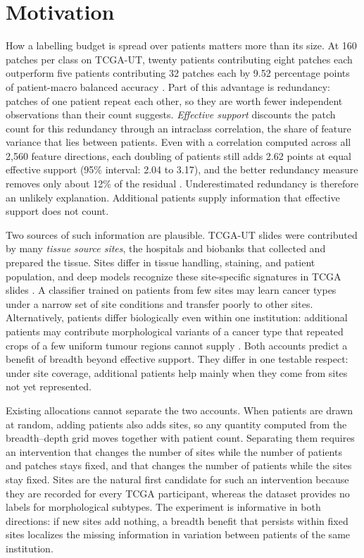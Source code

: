 \documentclass[11pt]{article}
\begin{document}
\section{Motivation}
\label{sec:motivation}
How a labelling budget is spread over patients matters more than its size. At 160 patches per class on TCGA-UT, twenty patients contributing eight patches each outperform five patients contributing 32 patches each by 9.52 percentage points of patient-macro balanced accuracy \citep{queisler2026effectiveSupport}. Part of this advantage is redundancy: patches of one patient repeat each other, so they are worth fewer independent observations than their count suggests. \emph{Effective support} discounts the patch count for this redundancy through an intraclass correlation, the share of feature variance that lies between patients. Even with a correlation computed across all 2,560 feature directions, each doubling of patients still adds 2.62 points at equal effective support (95\% interval: 2.04 to 3.17), and the better redundancy measure removes only about 12\% of the residual \citep{queisler2026multidirectionalRedundancy}. Underestimated redundancy is therefore an unlikely explanation. Additional patients supply information that effective support does not count.

Two sources of such information are plausible. TCGA-UT slides were contributed by many \emph{tissue source sites}, the hospitals and biobanks that collected and prepared the tissue. Sites differ in tissue handling, staining, and patient population, and deep models recognize these site-specific signatures in TCGA slides \citep{howard2021impact}. A classifier trained on patients from few sites may learn cancer types under a narrow set of site conditions and transfer poorly to other sites. Alternatively, patients differ biologically even within one institution: additional patients may contribute morphological variants of a cancer type that repeated crops of a few uniform tumour regions cannot supply \citep{komura2022universalEncoding}. Both accounts predict a benefit of breadth beyond effective support. They differ in one testable respect: under site coverage, additional patients help mainly when they come from sites not yet represented.

Existing allocations cannot separate the two accounts. When patients are drawn at random, adding patients also adds sites, so any quantity computed from the breadth--depth grid moves together with patient count. Separating them requires an intervention that changes the number of sites while the number of patients and patches stays fixed, and that changes the number of patients while the sites stay fixed. Sites are the natural first candidate for such an intervention because they are recorded for every TCGA participant, whereas the dataset provides no labels for morphological subtypes. The experiment is informative in both directions: if new sites add nothing, a breadth benefit that persists within fixed sites localizes the missing information in variation between patients of the same institution.
\end{document}

